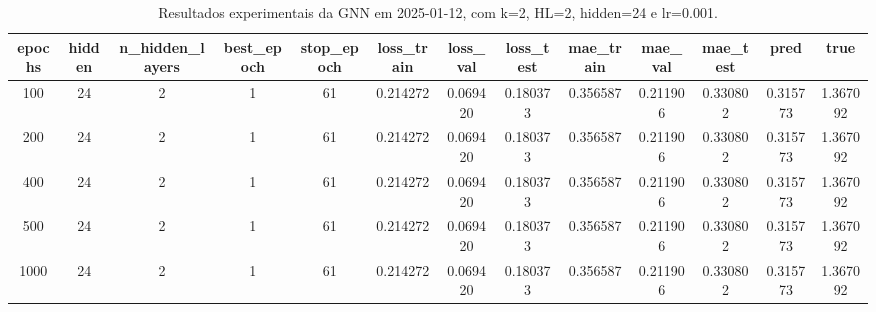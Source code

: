 \begin{table}[h]
\centering
\caption{Resultados experimentais da GNN em 2025-01-12, com k=2, HL=2, hidden=24 e lr=0.001.}
\label{tab:gnn_results_k2_hl2_h24_d20250112}
\begin{tabular}{ccccccccccccc}
\toprule
epochs & hidden & n\_hidden\_layers & best\_epoch & stop\_epoch & loss\_train & loss\_val & loss\_test & mae\_train & mae\_val & mae\_test & pred & true \\
\midrule
100 & 24 & 2 & 1 & 61 & 0.214272 & 0.069420 & 0.180373 & 0.356587 & 0.211906 & 0.330802 & 0.315773 & 1.367092 \\
200 & 24 & 2 & 1 & 61 & 0.214272 & 0.069420 & 0.180373 & 0.356587 & 0.211906 & 0.330802 & 0.315773 & 1.367092 \\
400 & 24 & 2 & 1 & 61 & 0.214272 & 0.069420 & 0.180373 & 0.356587 & 0.211906 & 0.330802 & 0.315773 & 1.367092 \\
500 & 24 & 2 & 1 & 61 & 0.214272 & 0.069420 & 0.180373 & 0.356587 & 0.211906 & 0.330802 & 0.315773 & 1.367092 \\
1000 & 24 & 2 & 1 & 61 & 0.214272 & 0.069420 & 0.180373 & 0.356587 & 0.211906 & 0.330802 & 0.315773 & 1.367092 \\
\bottomrule
\end{tabular}
\end{table}
